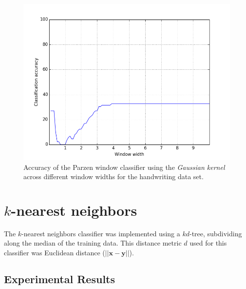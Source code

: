 \documentclass{article}
\numberwithin{figure}{section}
\newcommand{\bx}{\mathbf{x}}
\newcommand{\imgwidth}{.8\textwidth}
\begin{document}
\begin{figure}[H]
\centering
\includegraphics[width=\imgwidth]{pg_wine}
\caption{Accuracy of the Parzen window classifier using the \emph{Gaussian kernel} across different window widths for the handwriting data set.}
\label{pg_hand}
\end{figure}

\section{$k$-nearest neighbors}
The $k$-nearest neighbors classifier was implemented using a $kd$-tree, subdividing along the median of the training data. This distance metric $d$ used for this classifier was Euclidean distance ($||\bx - \textbf{y}||$).

\subsection{Experimental Results}

\end{document}
